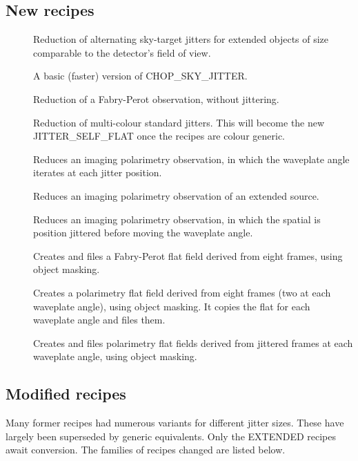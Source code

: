 \documentclass[twoside,11pt,nolof]{starlink}
\begin{document}
\subsection{New recipes}
\begin{description}
   \item []
      Reduction of alternating sky-target jitters for extended objects
      of size comparable to the detector's field of view.
   \item []
      A basic (faster) version of CHOP\_SKY\_JITTER.
   \item []
      Reduction of a Fabry-Perot observation, without jittering.
   \item []
      Reduction of multi-colour standard jitters.  This will become
      the new JITTER\_SELF\_FLAT once the recipes are colour generic.
   \item []
      Reduces an imaging polarimetry observation, in which the
      waveplate angle iterates at each jitter position.
   \item []
      Reduces an imaging polarimetry observation of an extended
      source.
   \item []
      Reduces an imaging polarimetry observation, in which the
      spatial is position jittered before moving the waveplate
      angle.
   \item []
      Creates and files a Fabry-Perot flat field derived from eight
      frames, using object masking.
   \item []
      Creates a polarimetry flat field derived from eight frames
      (two at each waveplate angle), using object masking.  It copies
      the flat for each waveplate angle and files them.
   \item []
      Creates and files polarimetry flat fields derived from jittered
      frames at each waveplate angle, using object masking.
\end{description}

\subsection{Modified recipes}
Many former recipes had numerous variants for different jitter sizes.
These have largely been superseded by generic equivalents.  Only the
EXTENDED recipes await conversion.  The families of recipes changed
are listed below.
\end{document}
